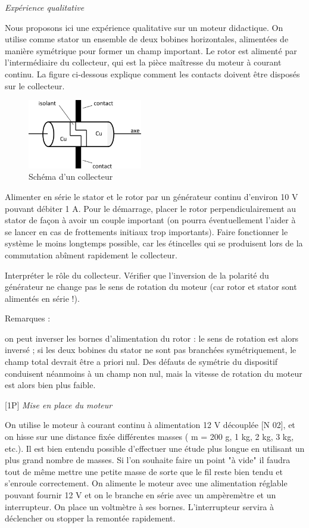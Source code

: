 \documentclass{article}%
\begin{document}
\textit{Expérience qualitative}

Nous proposons ici une expérience qualitative sur un moteur didactique. On utilise comme stator un ensemble de deux bobines horizontales, alimentées de manière symétrique pour former un champ important. Le rotor est alimenté par l'intermédiaire du collecteur, qui est la pièce maîtresse du moteur à courant continu. La figure ci-dessous explique comment les contacts doivent être disposés sur le collecteur.
\begin{figure}
	\centerline{\includegraphics[width=5cm]{images-exp/ConvPuiss2.png}}
	\caption{Schéma d'un collecteur}
\end{figure}


Alimenter en série le stator et le rotor par un générateur continu d'environ 10 V pouvant débiter 1 A. Pour le démarrage, placer le rotor perpendiculairement au stator de façon à avoir un couple important (on pourra éventuellement l'aider à se lancer en cas de frottements initiaux trop importants). Faire fonctionner le système le moins longtemps possible, car les étincelles qui se produisent lors de la commutation abîment rapidement le collecteur.

Interpréter le rôle du collecteur. Vérifier que l'inversion de la polarité du générateur ne change pas le sens de rotation du moteur (car rotor et stator sont alimentés en série !).

Remarques :

    on peut inverser les bornes d'alimentation du rotor : le sens de rotation est alors inversé ;
    si les deux bobines du stator ne sont pas branchées symétriquement, le champ total devrait être a priori nul. Des défauts de symétrie du dispositif conduisent néanmoins à un champ non nul, mais la vitesse de rotation du moteur est alors bien plus faible.

    [1P] \textit{Mise en place du moteur}

On utilise le moteur à courant continu à alimentation 12 V découplée [N 02], et on hisse sur une distance fixée différentes masses ( m = 200 g, 1 kg, 2 kg, 3 kg, etc.). Il est bien entendu possible d'effectuer une étude plus longue en utilisant un plus grand nombre de masses. Si l'on souhaite faire un point "à vide" il faudra tout de même mettre une petite masse de sorte que le fil reste bien tendu et s'enroule correctement. On alimente le moteur avec une alimentation réglable pouvant fournir 12 V et on le branche en série avec un ampèremètre et un interrupteur. On place un voltmètre à ses bornes. L'interrupteur servira à déclencher ou stopper la remontée rapidement.
\end{document}
